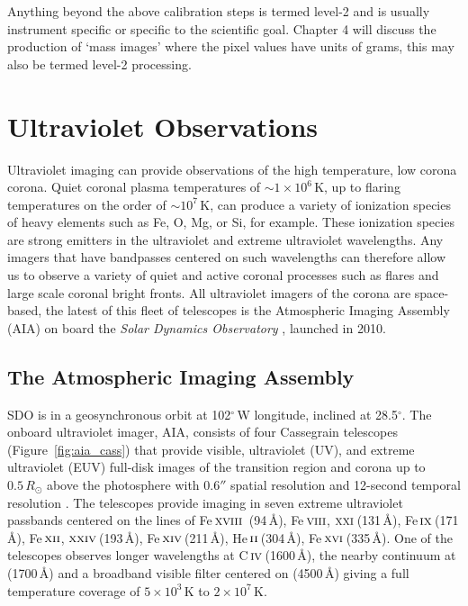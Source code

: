 Anything beyond the above calibration steps is termed level-2 and is usually instrument specific or specific to the scientific goal. Chapter 4 will discuss the production of `mass images' where the pixel values have units of grams, this may also be termed level-2 processing.


\section{Ultraviolet Observations}\label{sec:4}

Ultraviolet imaging can provide observations of the high temperature, low corona corona. Quiet coronal plasma temperatures of $\sim$$1\times10^6$\,K, up to flaring temperatures on the order of $\sim$$10^{7}$\,K, can produce a variety of ionization species of heavy elements such as Fe, O, Mg, or Si, for example. These ionization species are strong emitters in the ultraviolet and extreme ultraviolet wavelengths.
Any imagers that have bandpasses centered on such wavelengths can therefore allow us to observe a variety of quiet and active coronal processes such as flares and large scale coronal bright fronts. All ultraviolet imagers of the corona are space-based, the latest of this fleet of telescopes is the Atmospheric Imaging Assembly (AIA) on board the \emph{Solar Dynamics Observatory} \citep[\emph{SDO};][]{lemen2012}, launched in 2010.

\subsection{The Atmospheric Imaging Assembly}\label{sec:40}

SDO is in a geosynchronous orbit at 102$^{\circ}$\,W longitude, inclined at 28.5$^{\circ}$. The onboard ultraviolet imager, AIA, consists of four Cassegrain telescopes (Figure~\ref{fig:aia_cass}) that provide visible, ultraviolet (UV), and extreme ultraviolet (EUV) full-disk images of the transition region and corona up to $0.5\,R_{\odot}$ above the photosphere with 0.6$''$ spatial resolution and 12-second temporal resolution \citep{lemen2012}. The telescopes provide imaging in seven extreme ultraviolet passbands centered on the lines of Fe\,$\textsc{xviii}$ \,(94\,\AA), Fe\,$\textsc{viii}$, $\textsc{xxi}$\,(131\,\AA), Fe\,$\textsc{ix}$\,(171\,\AA), Fe\,$\textsc{xii}$, $\textsc{xxiv}$\,(193\,\AA), Fe\,$\textsc{xiv}$\,(211\,\AA), He\,$\textsc{ii}$\,(304\,\AA), Fe\,$\textsc{xvi}$\,(335\,\AA). One of the telescopes observes longer wavelengths at C\,$\textsc{iv}$\,(1600\,\AA), the nearby continuum at (1700\,\AA) and a broadband visible filter centered on (4500\,\AA)  giving a full temperature coverage of $5\times10^3$\,K to $2\times10^7$\,K.

